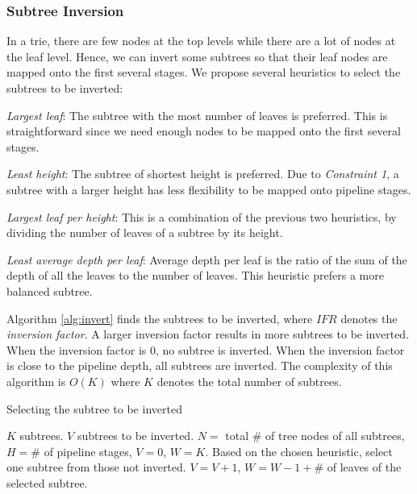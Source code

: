 \documentclass{sigcomm-alternate}
\begin{document}
\subsubsection{Subtree Inversion}
\label{sec:invert}

In a trie, there are few nodes at the top levels while there are a lot of nodes at the leaf level. Hence, we can invert some subtrees so that their leaf nodes are mapped onto the first several stages. We propose several heuristics to select the subtrees to be inverted: 
\begin{compactenum}
	\item \textit{Largest leaf}: The subtree with the most number of leaves is preferred. This is straightforward since we need enough nodes to be mapped onto the first several stages.
	\item \textit{Least height}: The subtree of shortest height is preferred. Due to \textit{Constraint 1}, a subtree with a larger height has less flexibility to be mapped onto pipeline stages.
	\item \textit{Largest leaf per height}: This is a combination of the previous two heuristics, by dividing the number of leaves of a subtree by its height.
	\item \textit{Least average depth per leaf}: Average depth per leaf is the ratio of the sum of the depth of all the leaves to the number of leaves. This heuristic prefers a more balanced subtree. \end{compactenum}

Algorithm \ref{alg:invert} finds the subtrees to be inverted, where $IFR$ denotes the \textit{inversion factor}. A larger inversion factor results in more subtrees to be inverted. When the inversion factor is 0, no subtree is inverted. When the inversion factor is close to the pipeline depth, all subtrees are inverted. The complexity of this algorithm is $O(K)$ where $K$ denotes the total number of subtrees.

\begin{algorithm}[htb]
\caption{Selecting the subtree to be inverted}
\label{alg:invert}
\begin{algorithmic}[1]
\REQUIRE $K$ subtrees.
\ENSURE $V$ subtrees to be inverted.
\STATE $N =$ total $\#$ of tree nodes of all subtrees, $H = \#$ of pipeline stages, $V = 0$, $W = K$.
\STATE Based on the chosen heuristic, select one subtree from those not inverted.
\STATE $V = V + 1$, $W = W - 1 + \#$ of leaves of the selected subtree.
\ENDWHILE
\end{algorithmic}
\end{algorithm}
\end{document}
